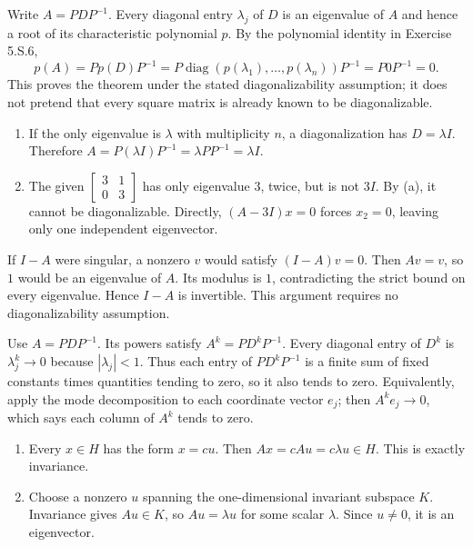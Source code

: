 Write $A=PDP^{-1}$. Every diagonal entry $\lambda_j$ of $D$
is an eigenvalue of $A$ and hence a root of its characteristic
polynomial $p$. By the polynomial identity in Exercise 5.S.6,
\[p(A)=Pp(D)P^{-1}=P\operatorname{diag}(p(\lambda_1),\ldots,
p(\lambda_n))P^{-1}=P0P^{-1}=0.\]
This proves the theorem under the stated diagonalizability
assumption; it does not pretend that every square matrix is
already known to be diagonalizable.

\begin{enumerate}[label=(\alph*)]
\item If the only eigenvalue is $\lambda$ with multiplicity $n$,
a diagonalization has $D=\lambda I$. Therefore
$A=P(\lambda I)P^{-1}=\lambda PP^{-1}=\lambda I$.
\item The given $\begin{bmatrix}3&1\\0&3\end{bmatrix}$ has only
eigenvalue $3$, twice, but is not $3I$. By (a), it cannot be
diagonalizable. Directly, $(A-3I)x=0$ forces $x_2=0$,
leaving only one independent eigenvector.
\end{enumerate}

If $I-A$ were singular, a nonzero $v$ would satisfy $(I-A)v=0$.
Then $Av=v$, so $1$ would be an eigenvalue of $A$.
Its modulus is $1$, contradicting the strict bound on every
eigenvalue. Hence $I-A$ is invertible. This argument requires no
diagonalizability assumption.

Use $A=PDP^{-1}$. Its powers satisfy $A^k=PD^kP^{-1}$.
Every diagonal entry of $D^k$ is $\lambda_j^k\to0$ because
$|\lambda_j|<1$. Thus each entry of $PD^kP^{-1}$ is a finite
sum of fixed constants times quantities tending to zero, so it also
tends to zero. Equivalently, apply the mode decomposition to each
coordinate vector $e_j$; then $A^ke_j\to0$, which says each
column of $A^k$ tends to zero.

\begin{enumerate}[label=(\alph*)]
\item Every $x\in H$ has the form $x=cu$. Then
$Ax=cAu=c\lambda u\in H$. This is exactly invariance.
\item Choose a nonzero $u$ spanning the one-dimensional invariant
subspace $K$. Invariance gives $Au\in K$, so $Au=\lambda u$
for some scalar $\lambda$. Since $u\ne0$, it is an eigenvector.
\end{enumerate}

